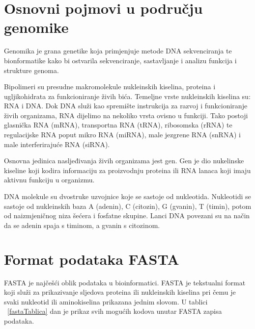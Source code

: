\documentclass[times, utf8, zavrsni, numeric]{fer}
\begin{document}
\section{Osnovni pojmovi u području genomike}
Genomika je grana genetike koja primjenjuje metode DNA sekvenciranja te bionformatike
kako bi ostvarila sekvenciranje, sastavljanje i analizu funkcija i strukture genoma. 

Bipolimeri su presudne makromolekule nukleinskih
kiselina, proteina i ugljikohidrata za funkcioniranje živih bića. Temeljne vrste nukleinskih kiselina su: RNA i DNA. Dok DNA služi kao spremište instrukcija za razvoj i funkcioniranje
živih organizama, RNA dijelimo na nekoliko vrsta ovisno u funkciji. Tako postoji glasnička RNA (mRNA), transportna RNA (tRNA), ribosomska (rRNA) te regulacijske RNA poput mikro RNA (miRNA), male jezgrene RNA (snRNA) i male interferirajuće RNA (siRNA).  

Osnovna jedinica nasljeđivanja živih organizama jest gen. Gen je dio nukelinske kiseline koji kodira informaciju za proizvodnju proteina ili RNA lanaca koji imaju aktivnu funkciju u organizmu.

DNA molekule su dvostruke uzvojnice koje se sastoje od nukleotida. Nukleotidi se sastoje od nukleinskih baza A (adenin), C (citozin), G (gvanin),  T (timin), potom od naizmjeničnog niza šećera i fosfatne skupine. Lanci DNA povezani su na način da se adenin spaja s timinom, a gvanin s citozinom.

\section{Format podataka FASTA}
FASTA je najčešći oblik podataka u bioinformatici. FASTA je tekstualni format koji služi za prikazivanje sljedova proteina ili nukleinskih kiselina pri čemu je svaki nukleotid ili aminokiselina prikazana jednim slovom. U tablici ~\ref{fastaTablica} dan je prikaz svih mogućih kodova unutar FASTA zapisa podataka.
\end{document}
